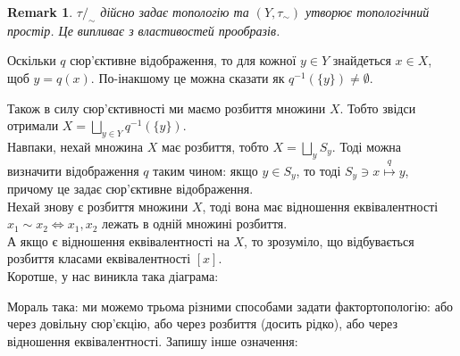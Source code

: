 \documentclass[a4paper, 10pt]{article}
\theoremstyle{theoremdd}
\newtheorem{remark}[theorem]{Remark}
\begin{document}
\begin{remark}
$\tau/_{\sim}$ дійсно задає топологію та $(Y,\tau_\sim)$ утворює топологічний простір. Це випливає з властивостей прообразів.
\end{remark}
\noindent
Оскільки $q$ сюр'єктивне відображення, то для кожної $y \in Y$ знайдеться $x \in X$, щоб $y = q(x)$. По-інакшому це можна сказати як $q^{-1}(\{y\}) \neq \emptyset$.
\begin{figure}[H]
\centering
{}
\end{figure}
\noindent Також в силу сюр'єктивності ми маємо розбиття множини $X$. Тобто звідси отримали $X = \displaystyle\bigsqcup_{y \in Y} q^{-1}(\{y\})$.
\bigskip \\
\noindent Навпаки, нехай множина $X$ має розбиття, тобто $X = \displaystyle\bigsqcup_{y} S_y$. Тоді можна визначити відображення $q$ таким чином: якщо $y \in S_y$, то тоді $S_y \ni x \overset{q}{\mapsto} y$, причому це задає сюр'єктивне відображення.
\bigskip \\
Нехай знову є розбиття множини $X$, тоді вона має відношення еквівалентності $x_1 \sim x_2 \iff x_1,x_2$ лежать в одній множині розбиття.\\
А якщо є відношення еквівалентності на $X$, то зрозуміло, що відбувається розбиття класами еквівалентності $[x]$.
\bigskip \\
Коротше, у нас виникла така діаграма:
\begin{figure}[H]
\centering
{}
\end{figure}
\noindent
Мораль така: ми можемо трьома різними способами задати фактортопологію: або через довільну сюр'єкцію, або через розбиття (досить рідко), або через відношення еквівалентності. Запишу інше означення:
\end{document}
